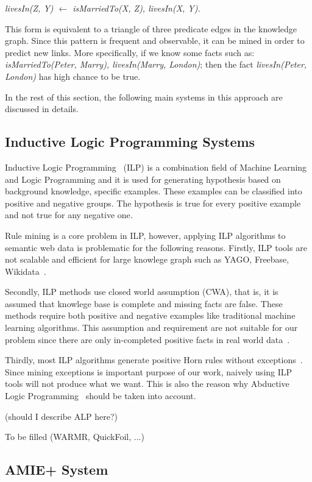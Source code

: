 \centerline{\textit{livesIn(Z, Y) $\leftarrow$ isMarriedTo(X, Z), livesIn(X, Y).}}

This form is equivalent to a triangle of three predicate edges in the knowledge graph. Since this pattern is frequent and observable, it can be mined in order to predict new links. More specifically, if we know some facts such as: \textit{isMarriedTo(Peter, Marry), livesIn(Marry, London)}; then the fact \textit{livesIn(Peter, London)} has high chance to be true.

In the rest of this section, the following main systems in this approach are discussed in details.

\subsection{Inductive Logic Programming Systems}

Inductive Logic Programming~\cite{ref9} (ILP) is a combination field of Machine Learning and Logic Programming and it is used for generating hypothesis based on background knowledge, specific examples. These examples can be classified into positive and negative groups. The hypothesis is true for every positive example and not true for any negative one.

Rule mining is a core problem in ILP, however, applying ILP algorithms to semantic web data is problematic for the following reasons. Firstly, ILP tools are not scalable and efficient for large knowlege graph such as YAGO, Freebase, Wikidata~\cite{ref10}. 

Secondly, ILP methods use closed world assumption (CWA), that is, it is assumed that knowlege base is complete and missing facts are false. These methods require both positive and negative examples like traditional machine learning algorithms. This assumption and requirement are not suitable for our problem since there are only in-completed positive facts in real world data~\cite{ref10}.

Thirdly, most ILP algorithms generate positive Horn rules without exceptions~\cite{ref11}. Since mining exceptions is important purpose of our work, naively using ILP tools will not produce what we want. This is also the reason why Abductive Logic Programming~\cite{ref11} should be taken into account.

(should I describe ALP here?)

To be filled (WARMR, QuickFoil, ...)

\subsection{AMIE+ System}

